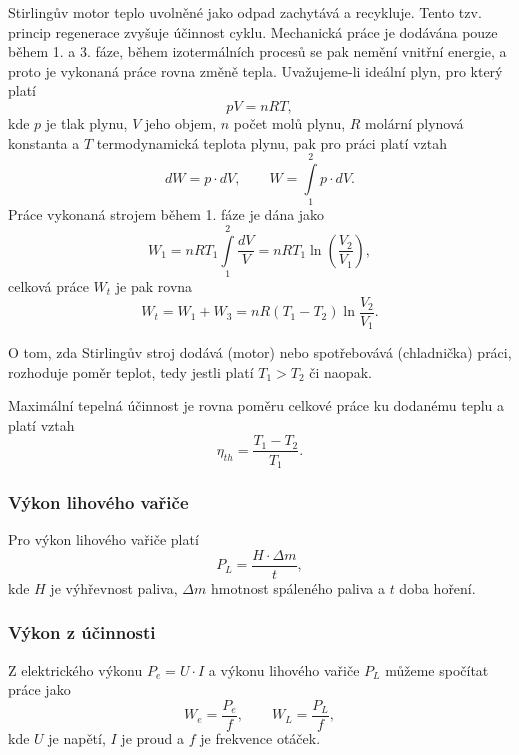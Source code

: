 \documentclass[english]{article}
\begin{document}
	Stirlingův motor teplo uvolněné jako odpad zachytává a recykluje. Tento tzv. princip regenerace zvyšuje účinnost cyklu. Mechanická práce je dodávána pouze během 1. a 3. fáze, během izotermálních procesů se pak nemění vnitřní energie, a proto je vykonaná práce rovna změně tepla. Uvažujeme-li ideální plyn, pro který platí
	\begin{equation}
	pV= nRT,
	\end{equation}
	kde $p$ je tlak plynu, $V$ jeho objem, $n$ počet molů plynu, $R$ molární plynová konstanta a $T$ termodynamická teplota plynu, pak pro práci platí vztah
	\begin{equation}
	dW=p\cdot dV,\qquad W=\int\limits_{1}^{2}p\cdot dV.
	\end{equation}
	Práce vykonaná strojem během 1. fáze je dána jako
	\begin{equation}
	W_{1}=nRT_{1}\int\limits_{1}^{2}\frac{dV}{V}=nRT_{1}\ln(\frac{V_{2}}{V_{1}}),
	\end{equation}
	celková práce $W_{t}$ je pak rovna
	\begin{equation}
	W_{t}=W_{1}+W_{3}=nR(T_{1}-T_{2})\ln\frac{V_{2}}{V_{1}}.
	\end{equation}
	
	 O tom, zda Stirlingův stroj dodává (motor) nebo spotřebovává (chladnička) práci, rozhoduje poměr teplot, tedy jestli platí $T_{1}>T_{2}$ či naopak. 
	
	Maximální tepelná účinnost je rovna poměru celkové práce ku dodanému teplu a platí vztah
	\begin{equation}
	\eta_{th} = \frac{T_{1}-T_{2}}{T_{1}}.
	\end{equation}

\subsubsection{Výkon lihového vařiče}
	Pro výkon lihového vařiče platí 
	\begin{equation}
	\label{eq:lihacek}
	P_L = \frac{H\cdot \Delta m}{t},
	\end{equation}
	kde $H$ je výhřevnost paliva, $\Delta m$ hmotnost spáleného paliva a $t$ doba hoření. 

\subsubsection{Výkon z účinnosti}
	Z elektrického výkonu $P_e = U \cdot I$ a výkonu lihového vařiče $P_L$ můžeme spočítat práce jako
	\begin{equation}
	W_e = \frac{P_e}{f},\qquad W_L = \frac{P_L}{f},
	\end{equation}
	kde $U$ je napětí, $I$ je proud a $f$ je frekvence otáček. 
	
\end{document}
